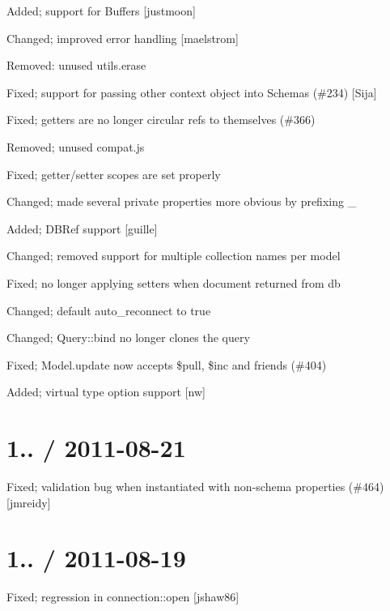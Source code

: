 \begin{DoxyItemize}
\item Added; support for Buffers \mbox{[}justmoon\mbox{]}
\item Changed; improved error handling \mbox{[}maelstrom\mbox{]}
\item Removed\+: unused utils.\+erase
\item Fixed; support for passing other context object into Schemas (\#234) \mbox{[}Sija\mbox{]}
\item Fixed; getters are no longer circular refs to themselves (\#366)
\item Removed; unused compat.\+js
\item Fixed; getter/setter scopes are set properly
\item Changed; made several private properties more obvious by prefixing \+\_\+
\item Added; D\+B\+Ref support \mbox{[}guille\mbox{]}
\item Changed; removed support for multiple collection names per model
\item Fixed; no longer applying setters when document returned from db
\item Changed; default auto\+\_\+reconnect to true
\item Changed; Query\+::bind no longer clones the query
\item Fixed; Model.\+update now accepts \$pull, \$inc and friends (\#404)
\item Added; virtual type option support \mbox{[}nw\mbox{]}
\end{DoxyItemize}

\section*{1.. / 2011-\/08-\/21 }


\begin{DoxyItemize}
\item Fixed; validation bug when instantiated with non-\/schema properties (\#464) \mbox{[}jmreidy\mbox{]}
\end{DoxyItemize}

\section*{1.. / 2011-\/08-\/19 }


\begin{DoxyItemize}
\item Fixed; regression in connection\+::open \mbox{[}jshaw86\mbox{]}
\end{DoxyItemize}

